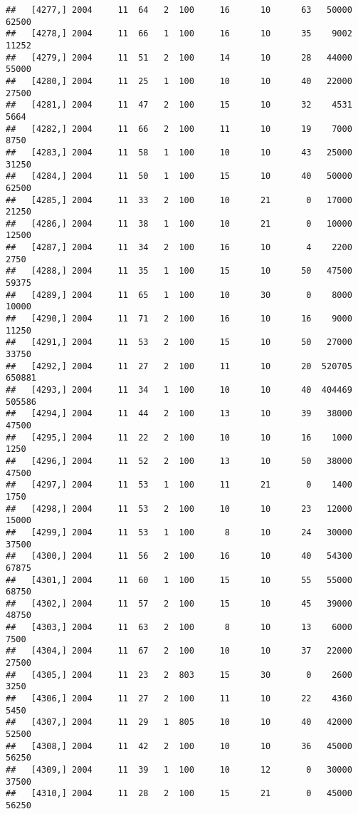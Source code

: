 \documentclass{article}\usepackage[]{graphicx}\usepackage[]{color}
\makeatletter
\newenvironment{kframe}{%
 \def\at@end@of@kframe{}%
 \ifinner\ifhmode%
  \def\at@end@of@kframe{\end{minipage}}%
  \begin{minipage}{\columnwidth}%
 \fi\fi%
 \def\FrameCommand##1{\hskip\@totalleftmargin \hskip-\fboxsep
 \colorbox{shadecolor}{##1}\hskip-\fboxsep
     \hskip-\linewidth \hskip-\@totalleftmargin \hskip\columnwidth}%
 \MakeFramed {\advance\hsize-\width
   \@totalleftmargin\z@ \linewidth\hsize
   \@setminipage}}%
 {\par\unskip\endMakeFramed%
 \at@end@of@kframe}
\newenvironment{knitrout}{}{} %
\makeatother
\begin{document}
\begin{knitrout}
\begin{kframe}
\begin{verbatim}
##   [4277,] 2004     11  64   2  100     16      10      63   50000   62500
##   [4278,] 2004     11  66   1  100     16      10      35    9002   11252
##   [4279,] 2004     11  51   2  100     14      10      28   44000   55000
##   [4280,] 2004     11  25   1  100     10      10      40   22000   27500
##   [4281,] 2004     11  47   2  100     15      10      32    4531    5664
##   [4282,] 2004     11  66   2  100     11      10      19    7000    8750
##   [4283,] 2004     11  58   1  100     10      10      43   25000   31250
##   [4284,] 2004     11  50   1  100     15      10      40   50000   62500
##   [4285,] 2004     11  33   2  100     10      21       0   17000   21250
##   [4286,] 2004     11  38   1  100     10      21       0   10000   12500
##   [4287,] 2004     11  34   2  100     16      10       4    2200    2750
##   [4288,] 2004     11  35   1  100     15      10      50   47500   59375
##   [4289,] 2004     11  65   1  100     10      30       0    8000   10000
##   [4290,] 2004     11  71   2  100     16      10      16    9000   11250
##   [4291,] 2004     11  53   2  100     15      10      50   27000   33750
##   [4292,] 2004     11  27   2  100     11      10      20  520705  650881
##   [4293,] 2004     11  34   1  100     10      10      40  404469  505586
##   [4294,] 2004     11  44   2  100     13      10      39   38000   47500
##   [4295,] 2004     11  22   2  100     10      10      16    1000    1250
##   [4296,] 2004     11  52   2  100     13      10      50   38000   47500
##   [4297,] 2004     11  53   1  100     11      21       0    1400    1750
##   [4298,] 2004     11  53   2  100     10      10      23   12000   15000
##   [4299,] 2004     11  53   1  100      8      10      24   30000   37500
##   [4300,] 2004     11  56   2  100     16      10      40   54300   67875
##   [4301,] 2004     11  60   1  100     15      10      55   55000   68750
##   [4302,] 2004     11  57   2  100     15      10      45   39000   48750
##   [4303,] 2004     11  63   2  100      8      10      13    6000    7500
##   [4304,] 2004     11  67   2  100     10      10      37   22000   27500
##   [4305,] 2004     11  23   2  803     15      30       0    2600    3250
##   [4306,] 2004     11  27   2  100     11      10      22    4360    5450
##   [4307,] 2004     11  29   1  805     10      10      40   42000   52500
##   [4308,] 2004     11  42   2  100     10      10      36   45000   56250
##   [4309,] 2004     11  39   1  100     10      12       0   30000   37500
##   [4310,] 2004     11  28   2  100     15      21       0   45000   56250

\end{verbatim}
\end{kframe}
\end{knitrout}
\end{document}
